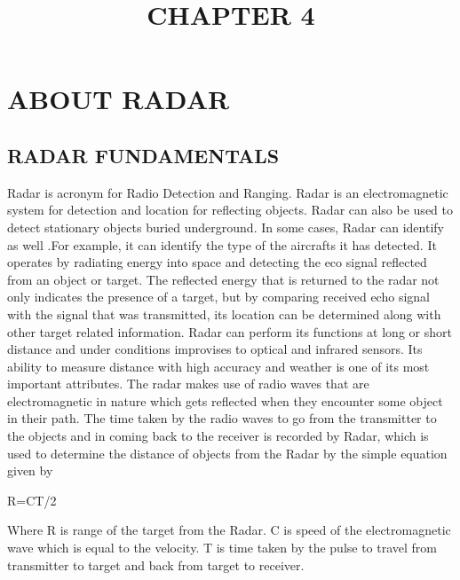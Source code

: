 \documentclass[14pt]{article} %
\begin{document}
\title{\huge {CHAPTER 4}}
\maketitle
\section{\huge {ABOUT RADAR}}

\subsection{RADAR FUNDAMENTALS}
Radar is acronym for Radio Detection and Ranging. Radar is an electromagnetic system for detection and location for reflecting objects. Radar can also be used to detect stationary objects buried underground. In some cases, Radar can identify as well .For example, it can identify the type of the aircrafts it has detected. It operates by radiating energy into space and detecting the eco signal reflected from an object or target. The reflected energy that is returned to the radar not only indicates the presence of a target, but by comparing received echo signal with the signal that was transmitted, its location can be determined along with other target related information. Radar can perform its functions at long or short distance and  under conditions improvises to optical and infrared sensors. Its ability to measure distance with high accuracy and weather is one of its most important attributes. The radar makes use of radio waves that are electromagnetic in nature which gets reflected when they encounter some object in their path. 
The time taken by the radio waves to go from the transmitter to the objects and in coming back to the receiver is recorded by Radar, which is used to determine the distance of objects from the Radar by the simple equation given by
 \begin{center}                                             
    R=CT/2
 \end{center}
Where R is range of the target from the Radar.
 C is speed of the electromagnetic wave which is equal to the velocity.
 T is time taken by the pulse to travel from transmitter to target and back from target to receiver.
\end{document}
